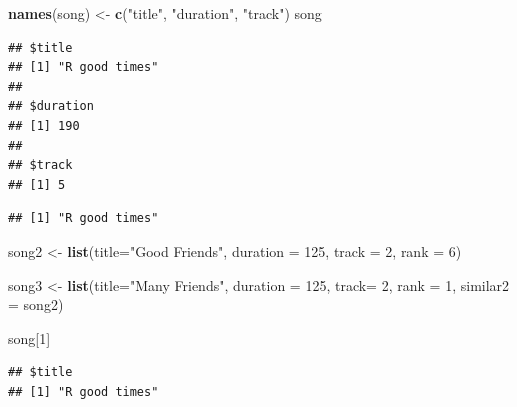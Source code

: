 \documentclass[]{book}
\newenvironment{Shaded}{\begin{snugshade}}{\end{snugshade}}
\newcommand{\KeywordTok}[1]{\textcolor[rgb]{0.13,0.29,0.53}{\textbf{{#1}}}}
\newcommand{\DataTypeTok}[1]{\textcolor[rgb]{0.13,0.29,0.53}{{#1}}}
\newcommand{\DecValTok}[1]{\textcolor[rgb]{0.00,0.00,0.81}{{#1}}}
\newcommand{\StringTok}[1]{\textcolor[rgb]{0.31,0.60,0.02}{{#1}}}
\newcommand{\NormalTok}[1]{{#1}}
\begin{document}
\begin{Shaded}
\begin{Highlighting}[]
\KeywordTok{names}\NormalTok{(song) <-}\StringTok{ }\KeywordTok{c}\NormalTok{(}\StringTok{"title"}\NormalTok{, }\StringTok{"duration"}\NormalTok{, }\StringTok{"track"}\NormalTok{)}
\NormalTok{song}
\end{Highlighting}
\end{Shaded}

\begin{verbatim}
## $title
## [1] "R good times"
## 
## $duration
## [1] 190
## 
## $track
## [1] 5
\end{verbatim}

\begin{Shaded}
\end{Shaded}

\begin{verbatim}
## [1] "R good times"
\end{verbatim}

\begin{Shaded}
\begin{Highlighting}[]
\NormalTok{song2 <-}\StringTok{ }\KeywordTok{list}\NormalTok{(}\DataTypeTok{title=}\StringTok{"Good Friends"}\NormalTok{, }
              \DataTypeTok{duration =} \DecValTok{125}\NormalTok{,}
              \DataTypeTok{track =} \DecValTok{2}\NormalTok{,}
              \DataTypeTok{rank =} \DecValTok{6}\NormalTok{)}

\NormalTok{song3 <-}\StringTok{ }\KeywordTok{list}\NormalTok{(}\DataTypeTok{title=}\StringTok{"Many Friends"}\NormalTok{, }
              \DataTypeTok{duration =} \DecValTok{125}\NormalTok{,}
              \DataTypeTok{track=} \DecValTok{2}\NormalTok{,}
              \DataTypeTok{rank =} \DecValTok{1}\NormalTok{,}
              \DataTypeTok{similar2 =} \NormalTok{song2)}

\NormalTok{song[}\DecValTok{1}\NormalTok{]}
\end{Highlighting}
\end{Shaded}

\begin{verbatim}
## $title
## [1] "R good times"
\end{verbatim}

\begin{Shaded}
\end{Shaded}
\end{document}
